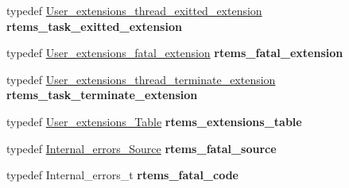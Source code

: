 \begin{DoxyCompactItemize}
\item 
\mbox{\label{group__ClassicUserExtensions_ga061c1d4bf734f7b38eaeb23f16d8021d}} 
typedef \mbox{\hyperlink{group__RTEMSScoreUserExt_ga876d6c2dd2ba0083ea94332a9438a91b}{User\+\_\+extensions\+\_\+thread\+\_\+exitted\+\_\+extension}} {\bfseries rtems\+\_\+task\+\_\+exitted\+\_\+extension}
\item 
\mbox{\label{group__ClassicUserExtensions_gaa5f3d3bba6ca442724454eced0f2fdb8}} 
typedef \mbox{\hyperlink{group__RTEMSScoreUserExt_gab9b016d654a82fef8666c465c2736a05}{User\+\_\+extensions\+\_\+fatal\+\_\+extension}} {\bfseries rtems\+\_\+fatal\+\_\+extension}
\item 
\mbox{\label{group__ClassicUserExtensions_gaa1dfb0f51ce2d26ee70c6f3983b76d7d}} 
typedef \mbox{\hyperlink{group__RTEMSScoreUserExt_gab2e511a997080ca8050ac25a3bece8e4}{User\+\_\+extensions\+\_\+thread\+\_\+terminate\+\_\+extension}} {\bfseries rtems\+\_\+task\+\_\+terminate\+\_\+extension}
\item 
\mbox{\label{group__ClassicUserExtensions_ga8725f6c4d5d47572e2b3287c3667bb22}} 
typedef \mbox{\hyperlink{structUser__extensions__Table}{User\+\_\+extensions\+\_\+\+Table}} {\bfseries rtems\+\_\+extensions\+\_\+table}
\item 
\mbox{\label{group__ClassicUserExtensions_gae8f714220940766490eef716665cb12d}} 
typedef \mbox{\hyperlink{group__RTEMSScoreIntErr_ga878b4de77df7d0b83d19609d4de42c26}{Internal\+\_\+errors\+\_\+\+Source}} {\bfseries rtems\+\_\+fatal\+\_\+source}
\item 
\mbox{\label{group__ClassicUserExtensions_ga574eba3799b1b4843c1ebc04a240bb1e}} 
typedef Internal\+\_\+errors\+\_\+t {\bfseries rtems\+\_\+fatal\+\_\+code}
\end{DoxyCompactItemize}
